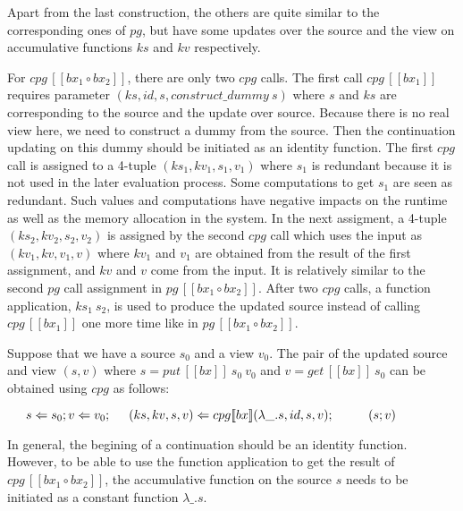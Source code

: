 \documentclass[runningheads]{llncs}
\newcommand{\tab}{\hspace*{5mm}}
\newcommand{\qtab}{\hspace*{5mm} \ \quad}
\newcommand{\putbx}[3]{put \, [\![#1]\!] \ #2 \ #3}
\newcommand{\getbx}[2]{get \, [\![#1]\!] \ #2}
\newcommand{\pginline}[1]{pg \, [\![#1]\!]}
\newcommand{\cpg}[5]{cpg [\![#1]\!] (#2, #3, #4, #5)}
\newcommand{\cpginline}[1]{cpg \, [\![#1]\!]}
\begin{document}
Apart from the last construction, the others are quite similar to the corresponding ones of $pg$, but have some updates over the source and the view on accumulative functions $ks$ and $kv$ respectively.

For $\cpginline{bx_1 \circ bx_2}$, there are only two $cpg$ calls. The first call $\cpginline{bx_1}$ requires parameter $(ks, id, s, construct\_dummy \ s)$ where $s$ and $ks$ are corresponding to the source and the update over source. Because there is no real view here, we need to construct a dummy from the source. Then the continuation updating on this dummy should be initiated as an identity function. The first $cpg$ call is assigned to a 4-tuple $(ks_1, kv_1, s_1, v_1)$ where $s_1$ is redundant because it is not used in the later evaluation process. Some computations to get $s_1$ are seen as redundant. Such values and computations have negative impacts on the runtime as well as the memory allocation in the system. In the next assigment, a 4-tuple $(ks_2, kv_2, s_2, v_2)$ is assigned by the second $cpg$ call which uses the input as $(kv_1, kv, v_1, v)$ where $kv_1$ and $v_1$ are obtained from the result of the first assignment, and $kv$ and $v$ come from the input. It is relatively similar to the second $pg$ call assignment in $\pginline{bx_1 \circ bx_2}$. After two $cpg$ calls, a function application, $ks_1 \ s_2$, is used to produce the updated source instead of calling $\cpginline{bx_1}$ one more time like in $\pginline{bx_1 \circ bx_2}$.

Suppose that we have a source $s_0$ and a view $v_0$. The pair of the updated source and view $(s, v)$ where $s = \putbx{bx}{s_0}{v_0}$ and $v = \getbx{bx}{s_0}$ can be obtained using $cpg$ as follows:

    $\tab s \Leftarrow s_0; v \Leftarrow v_0;\\
    \tab (ks, kv, s, v) \Leftarrow \cpg{bx}{\lambda \_.s}{id}{s}{v};\\
        \qtab (s; v)$

In general, the begining of a continuation should be an identity function. However, to be able to use the function application to get the result of $\cpginline{bx_1 \circ bx_2}$, the accumulative function on the source $s$ needs to be initiated as a constant function $\lambda \_.s$.
\end{document}
